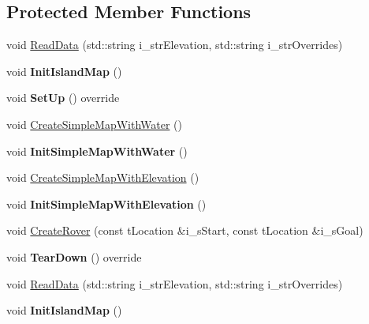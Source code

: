 \subsection*{Protected Member Functions}
\begin{DoxyCompactItemize}
\item 
void \mbox{\hyperlink{classc_planner_test_af8a0f625c6cb4dffc1ea3182332e53c6}{Read\+Data}} (std\+::string i\+\_\+str\+Elevation, std\+::string i\+\_\+str\+Overrides)
\item 
\mbox{\label{classc_planner_test_ac1aac6152ea3ac86c5205fd8f0835d0c}} 
void {\bfseries Init\+Island\+Map} ()
\item 
\mbox{\label{classc_planner_test_a88ad8b0e63c66a9d94c7606aa67ef20d}} 
void {\bfseries Set\+Up} () override
\item 
void \mbox{\hyperlink{classc_planner_test_a1e8b184185494cae8444fb7d5f846334}{Create\+Simple\+Map\+With\+Water}} ()
\item 
\mbox{\label{classc_planner_test_aa55c78961deacf34543933e12cd82000}} 
void {\bfseries Init\+Simple\+Map\+With\+Water} ()
\item 
void \mbox{\hyperlink{classc_planner_test_a3d08d274ae12fbecd664ec70b4d6dfa3}{Create\+Simple\+Map\+With\+Elevation}} ()
\item 
\mbox{\label{classc_planner_test_a59339eef13103205b18ab2f1b1f59d7e}} 
void {\bfseries Init\+Simple\+Map\+With\+Elevation} ()
\item 
void \mbox{\hyperlink{classc_planner_test_adc6dedb45d227191f0c87843a182d802}{Create\+Rover}} (const t\+Location \&i\+\_\+s\+Start, const t\+Location \&i\+\_\+s\+Goal)
\item 
\mbox{\label{classc_planner_test_ae7db6ebf867e3ba6bf8adaaca636f064}} 
void {\bfseries Tear\+Down} () override
\item 
void \mbox{\hyperlink{classc_planner_test_af8a0f625c6cb4dffc1ea3182332e53c6}{Read\+Data}} (std\+::string i\+\_\+str\+Elevation, std\+::string i\+\_\+str\+Overrides)
\item 
\mbox{\label{classc_planner_test_ac1aac6152ea3ac86c5205fd8f0835d0c}} 
void {\bfseries Init\+Island\+Map} ()
\item 

\end{DoxyCompactItemize}
